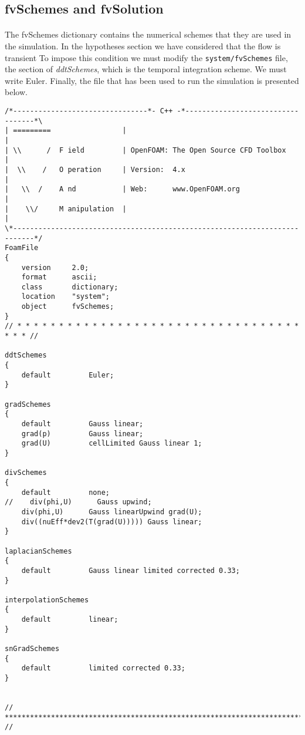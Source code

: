 \subsection{fvSchemes and fvSolution}
\paragraph{}
The fvSchemes dictionary contains the numerical schemes that they are used in the simulation. In the hypotheses section we have considered that the flow is transient To impose this condition we must modify the \texttt{system/fvSchemes} file, the section of \textit{ddtSchemes}, which is the temporal integration scheme. We must write Euler. Finally, the file that has been used to run the simulation is presented below.

\begin{footnotesize}
\begin{verbatim}
/*--------------------------------*- C++ -*----------------------------------*\
| =========                 |                                                 |
| \\      /  F ield         | OpenFOAM: The Open Source CFD Toolbox           |
|  \\    /   O peration     | Version:  4.x                                   |
|   \\  /    A nd           | Web:      www.OpenFOAM.org                      |
|    \\/     M anipulation  |                                                 |
\*---------------------------------------------------------------------------*/
FoamFile
{
    version     2.0;
    format      ascii;
    class       dictionary;
    location    "system";
    object      fvSchemes;
}
// * * * * * * * * * * * * * * * * * * * * * * * * * * * * * * * * * * * * * //

ddtSchemes
{
    default         Euler;
}

gradSchemes
{
    default         Gauss linear;
    grad(p)         Gauss linear;
    grad(U)         cellLimited Gauss linear 1;
}

divSchemes
{
    default         none;
//    div(phi,U)      Gauss upwind;
    div(phi,U)      Gauss linearUpwind grad(U);
    div((nuEff*dev2(T(grad(U))))) Gauss linear;
}

laplacianSchemes
{
    default         Gauss linear limited corrected 0.33;
}

interpolationSchemes
{
    default         linear;
}

snGradSchemes
{
    default         limited corrected 0.33;
}


// ************************************************************************* //

\end{verbatim}
\end{footnotesize}


